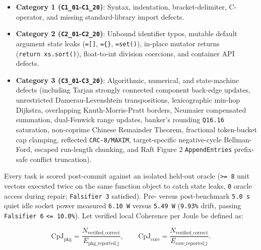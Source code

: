 \documentclass[10pt,letterpaper]{article}
\providecommand{\tightlist}{\setlength{\itemsep}{1pt}\setlength{\parskip}{0pt}}
\begin{document}
\begin{itemize}
\tightlist
\item
  \textbf{Category 1 (\texttt{C1\_01}-\texttt{C1\_20})}: Syntax,
  indentation, bracket-delimiter, C-operator, and missing
  standard-library import defects.
\item
  \textbf{Category 2 (\texttt{C2\_01}-\texttt{C2\_20})}: Unbound
  identifier typos, mutable default argument state leaks
  (\texttt{={[}{]}}, \texttt{=\{\}}, \texttt{=set()}), in-place mutator
  returns (\texttt{return\ xs.\allowbreak{}sort(\allowbreak{})}), float-to-int division coercions,
  and container API defects.
\item
  \textbf{Category 3 (\texttt{C3\_01}-\texttt{C3\_20})}: Algorithmic,
  numerical, and state-machine defects (including Tarjan strongly
  connected component back-edge updates, unrestricted
  Damerau-Levenshtein transpositions, lexicographic min-hop Dijkstra,
  overlapping Knuth-Morris-Pratt borders, Neumaier compensated
  summation, dual-Fenwick range updates, banker's rounding
  \texttt{Q16.16} saturation, non-coprime Chinese Remainder Theorem,
  fractional token-bucket cap clamping, reflected \texttt{CRC-\allowbreak{}8/\allowbreak{}MAXIM},
  target-specific negative-cycle Bellman-Ford, escaped run-length
  chunking, and Raft Figure 2 \texttt{AppendEntries} prefix-safe
  conflict truncation).
\end{itemize}

Every task is scored post-commit against an isolated held-out oracle
(\texttt{\textgreater{}=\ 8} unit vectors executed twice on the same
function object to catch state leaks, \texttt{0} oracle access during
repair; \texttt{Falsifier\ 3} satisfied). Pre- versus post-benchmark
\texttt{5.0\ s} quiet idle socket power measured \texttt{6.10\ W} versus
\texttt{5.49\ W} (\texttt{9.93\%} drift, passing \texttt{Falsifier\ 6}
\texttt{\textless{}=\ 10.0\%}). Let verified local Coherence per Joule
be defined as:

\[
\mathrm{CpJ}_{\text{pkg}} = \frac{N_{\text{verified\_correct}}}{E_{\text{pkg\_reported\_j}}}, \qquad \mathrm{CpJ}_{\text{core}} = \frac{N_{\text{verified\_correct}}}{E_{\text{core\_reported\_j}}}.
\]
\end{document}
